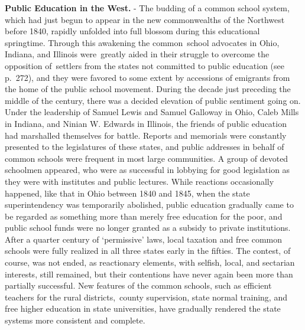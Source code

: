 \documentclass[]{book}
\begin{document}
\textbf{Public Education in the West.} - The budding of a common school system, which had just begun to appear in the new commonwealths of the Northwest before 1840, rapidly unfolded into full blossom during this educational springtime. Through this awakening the common~school advocates in Ohio, Indiana, and Illinois were~greatly aided in their struggle to overcome the opposition of~settlers from the states not committed to public education (see p.~272), and they were favored to some extent by accessions of emigrants from the home of the public school movement. During the decade just preceding the middle of the century, there was a decided elevation of public sentiment going on. Under the leadership of Samuel Lewis and Samuel Galloway in Ohio, Caleb Mills in Indiana, and Ninian W. Edwards in Illinois, the friends of public education had marshalled themselves for battle. Reports and memorials were constantly presented to the legislatures of these states, and public addresses in behalf of common schools were frequent in most large communities. A group of devoted schoolmen appeared, who were as successful in lobbying for good legislation as they were with institutes and public lectures. While reactions occasionally happened, like that in Ohio between 1840 and 1845, when the state superintendency was temporarily abolished, public education gradually came to be regarded as something more than merely free education for the poor, and public school funds were no longer granted as a subsidy to private institutions. After a quarter century of `permissive' laws, local taxation and free common schools were fully realized in all three states early in the fifties. The contest, of course, was not ended, as reactionary elements, with selfish, local, and sectarian interests, still remained, but their contentions have never again been more than partially successful. New features of the common schools, such as efficient teachers for the rural districts,~county supervision, state normal training, and free higher education in state universities, have gradually rendered the state systems more consistent and complete.
\end{document}
